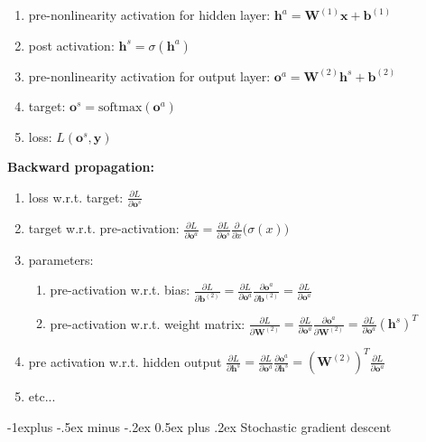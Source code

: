\documentclass[10pt,landscape]{article}
\makeatletter
\renewcommand{\subsection}{\@startsection{subsection}{2}{0mm}%
                                {-1explus -.5ex minus -.2ex}%
                                {0.5ex plus .2ex}%
                                {\normalfont\normalsize\bfseries}}
\makeatother
\begin{document}
\begin{multicols}{3}
\begin{enumerate}
\item pre-nonlinearity activation for hidden layer: $\boldsymbol h^a = \boldsymbol W^{(1)} \boldsymbol x + \boldsymbol b^{(1)}$
\item post activation: $\boldsymbol h^s = \sigma(\boldsymbol h^a)$
\item pre-nonlinearity activation for output layer: $\boldsymbol o^a = \boldsymbol W^{(2)} \boldsymbol h^s + \boldsymbol b^{(2)}$
\item target: $\boldsymbol o^s = \text{softmax}(\boldsymbol o^a)$
\item loss: $L(\boldsymbol o^s, \boldsymbol y)$
\end{enumerate}

\textbf{Backward propagation:}

\begin{enumerate}
\item loss w.r.t. target: $\frac{\partial L}{\partial \boldsymbol o^s}$
\item target w.r.t. pre-activation: $\frac{\partial L}{\partial \boldsymbol o^a} = \frac{\partial L}{\partial \boldsymbol o^s} \frac{\partial}{\partial x} \big(\sigma(x)\big) $
\item parameters:
\begin{enumerate}
\item pre-activation w.r.t. bias: $\frac{\partial L}{\partial \boldsymbol b^{(2)}} = \frac{\partial L}{\partial \boldsymbol o^a} \frac{\partial \boldsymbol o^a}{\partial \boldsymbol b^{(2)}} = \frac{\partial L}{\partial \boldsymbol o^a}$
\item pre-activation w.r.t. weight matrix: $\frac{\partial L}{\partial \boldsymbol W^{(2)}} = \frac{\partial L}{\partial \boldsymbol o^a} \frac{\partial \boldsymbol o^a}{\partial \boldsymbol W^{(2)}} = \frac{\partial L}{\partial \boldsymbol o^a} (\boldsymbol h^s)^T$
\end{enumerate}
\item pre activation w.r.t. hidden output $\frac{\partial L}{\partial \boldsymbol h^s} = \frac{\partial L}{\partial \boldsymbol o^a}\frac{\partial \boldsymbol o^a}{\partial \boldsymbol h^s} = (\boldsymbol W^{(2)})^T \frac{\partial L}{\partial \boldsymbol o^a}$
\item etc...
\end{enumerate}

\subsection{Stochastic gradient descent}


\end{multicols}
\end{document}
